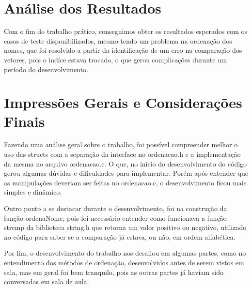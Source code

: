 \documentclass{article}
\begin{document}
\clearpage
\section{Análise dos Resultados}
    \par Com o fim do trabalho prático, conseguimos obter os resultados esperados com os casos de teste disponibilizados, mesmo tendo um problema na ordenação dos nomes, que foi resolvido a partir da identificação de um erro na comparação dos vetores, pois o indíce estava trocado, o que gerou complicações durante um período do desenvolvimento.

\clearpage
\section{Impressões Gerais e Considerações Finais}

Fazendo uma análise geral sobre o trabalho, foi possível compreender melhor o uso das structs com a separação da interface no ordenacao.h e a implementação da mesma no arquivo ordenacao.c. O que, no início do desenvolvimento do código gerou algumas dúvidas e dificuldades para implementar. Porém após entender que as manipulações deveriam ser feitas no ordenacao.c, o desenvolvimento ficou mais simples e dinâmico.
\par Outro ponto a se destacar durante o desenvolvimento, foi na construção da função ordenaNome, pois foi necessário entender como funcionava a função strcmp da biblioteca string.h que retorna um valor positivo ou negativo, utilizado no código para saber se a comparação já estava, ou não, em ordem alfabética.
\par Por fim, o desenvolvimento do trabalho nos desafiou em algumas partes, como no entendimento dos métodos de ordenação, desenvolvidos antes de serem vistos em sala, mas em geral foi bem tranquilo, pois as outras partes já haviam sido conversadas em sala de aula.


\clearpage
\end{document}
